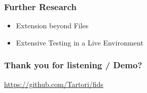 \documentclass{beamer}
\begin{document}
\begin{frame}[fragile]
  \frametitle{Further Research}
    \begin{itemize}
      \item Extension beyond Files
      \item Extensive Testing in a Live Environment
    \end{itemize}
\end{frame}


\begin{frame}
  \frametitle{Thank you for listening / Demo?}
  \url{https://github.com/Tartori/fids}
\end{frame}
\end{document}
